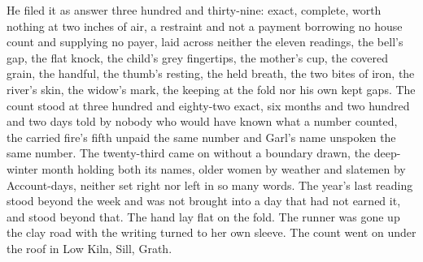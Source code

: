 He filed it as answer three hundred and thirty-nine: exact, complete, worth nothing at two inches of air, a restraint and not a payment borrowing no house count and supplying no payer, laid across neither the eleven readings, the bell's gap, the flat knock, the child's grey fingertips, the mother's cup, the covered grain, the handful, the thumb's resting, the held breath, the two bites of iron, the river's skin, the widow's mark, the keeping at the fold nor his own kept gaps. The count stood at three hundred and eighty-two exact, six months and two hundred and two days told by nobody who would have known what a number counted, the carried fire's fifth unpaid the same number and Garl's name unspoken the same number. The twenty-third came on without a boundary drawn, the deep-winter month holding both its names, older women by weather and slatemen by Account-days, neither set right nor left in so many words. The year's last reading stood beyond the week and was not brought into a day that had not earned it, and  stood beyond that. The hand lay flat on the fold. The runner was gone up the clay road with the writing turned to her own sleeve. The count went on under the roof in Low Kiln, Sill, Grath.
